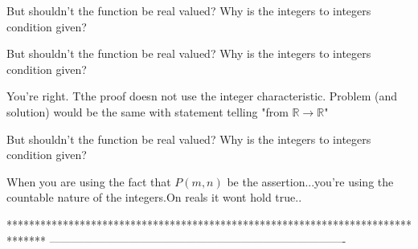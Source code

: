 \begin{solution}
	But shouldn't the function be real valued?
Why is the integers to integers condition given?
\end{solution}



\begin{solution}
	\begin{tcolorbox}But shouldn't the function be real valued?
Why is the integers to integers condition given?\end{tcolorbox}
You're right. Tthe proof  doesn not use the integer characteristic. Problem (and solution) would be the same with statement telling "from $\mathbb R \to\mathbb R$"
\end{solution}



\begin{solution}
	\begin{tcolorbox}But shouldn't the function be real valued?
Why is the integers to integers condition given?\end{tcolorbox}
When you are using the fact that $P(m,n)$ be the assertion...you're using the countable nature of the integers.On reals it wont hold true..
\end{solution}



*******************************************************************************
-------------------------------------------------------------------------------

